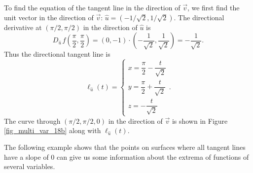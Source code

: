 \begin{example}
To find the equation of the tangent line in the direction of $\vec v$, we first find the unit vector in the direction of $\vec v$: $\hat u = \left( -1/\sqrt{2},1/\sqrt{2}\right)$. The directional derivative at $(\pi/2,\pi/2)$ in the direction of $\hat u$ is 
$$D_{\hat u\,}f\left(\dfrac{\pi}{2},\dfrac{\pi}{2}\right) = \left( 0,-1\right) \cdot \left( -\dfrac{1}{\sqrt{2}},\dfrac{1}{\sqrt{2}}\right) = -\dfrac{1}{\sqrt{2}}.$$
Thus the directional tangent line is 
$$\ell_{\hat u}(t) = \left\{\begin{array}{l} x= \dfrac{\pi}{2} -\dfrac{t}{\sqrt{2}}\\ y = \dfrac{\pi}{2} + \dfrac{t}{\sqrt{2}} \\ z= -\dfrac{t}{\sqrt{2}}\end{array}\right. .$$
The curve through $(\pi/2,\pi/2,0)$ in the direction of $\vec v$ is shown in Figure \ref{fig_multi_var_18b} along with $\ell_{\hat u}(t)$.



\end{example}


The following example shows that the points on surfaces where all tangent lines have a slope of 0 can give us some information about the extrema of functions of several variables. 

